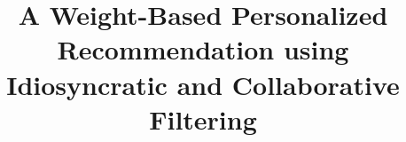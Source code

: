 \documentclass{acm_proc_article-sp}
\begin{document}
\title{A Weight-Based Personalized Recommendation using Idiosyncratic and Collaborative Filtering}

\maketitle
\end{document}

